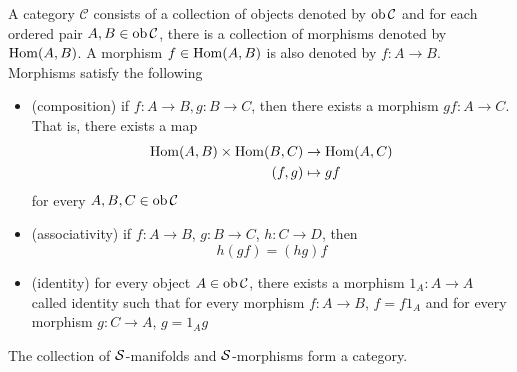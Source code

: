 \begin{definition}[Category]
	A category $\mathcal{C}$ consists of a collection of objects denoted by $\operatorname{ob} \mathcal{C}$ and for each ordered pair $A, B \in \operatorname{ob} \mathcal{C}$, there is a collection of morphisms denoted by $\operatorname{Hom}(A, B)$. A morphism $f \in \operatorname{Hom}(A, B)$ is also denoted by $f: A \to B$. Morphisms satisfy the following
	\begin{itemize}
		\item (composition) if $f: A \to B, g: B \to C$, then there exists a morphism $gf: A \to C$. That is, there exists a map
		\begin{align*}
			\operatorname{Hom}(A, B) \times \operatorname{Hom}(B, C) &\to \operatorname{Hom}(A, C) \\
			(f, g) &\mapsto gf
		\end{align*}
		for every $A, B, C \in \operatorname{ob} \mathcal{C}$
		
		\item (associativity) if $f: A \to B$, $g: B \to C$, $h: C \to D$, then
		$$
		h(gf) = (hg)f
		$$
		
		\item (identity) for every object $A \in \operatorname{ob} \mathcal{C}$, there exists a morphism $1_A: A \to A$ called identity such that for every morphism $f: A \to B$, $f = f 1_A$ and for every morphism $g: C \to A$, $g = 1_A g$
		
	\end{itemize}
\end{definition}

\begin{proposition}
	The collection of $\mathcal{S}$-manifolds and $\mathcal{S}$-morphisms form a category.
\end{proposition}